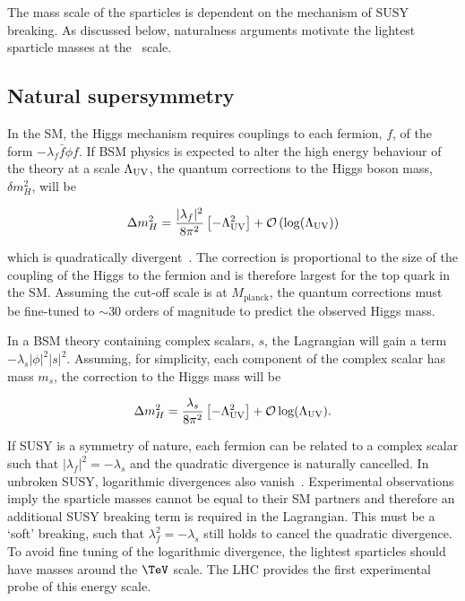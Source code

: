 The mass scale of the sparticles is dependent on the mechanism of SUSY breaking.
As discussed below, naturalness arguments motivate the lightest sparticle masses 
at the \TeV~scale.

\subsection{Natural supersymmetry}
\label{sec:natSUSY}
In the SM, the Higgs mechanism requires couplings to each fermion, $f$, of the form $-\lambda_{f}\bar{f}\phi f$. If BSM physics
is expected to alter the high energy behaviour of the theory at a scale $\Lambda_{\mathrm{UV}}$, the quantum corrections 
to the Higgs boson mass, $\delta m^2_{H}$, will be 

\begin{equation}
\Delta m^2_H =  \frac{|\lambda_f|^2}{8\pi^2}\left[-\Lambda^2_{\text{UV}}\right] + \mathcal{O}\left(\log(\Lambda_{\mathrm{UV}})\right)
\end{equation}

\noindent which is quadratically divergent~\cite{HMSSM}. The correction is proportional to the size of the coupling of the Higgs to the fermion 
and is therefore largest for the top quark in the SM. Assuming the cut-off scale is at $M_{\text{planck}}$, the quantum 
corrections must be fine-tuned to $\sim 30$ orders of magnitude to predict the observed Higgs mass. 

In a BSM theory containing complex scalars, $s$, the Lagrangian will gain a term $-\lambda_{s}|\phi|^2|s|^2$.
Assuming, for simplicity, each component of the complex scalar has mass $m_s$, the correction to the Higgs mass will be

\begin{equation}
\label{equ:corrHiggsSusy}
\Delta m^2_H =  \frac{\lambda_s}{8\pi^2}\left[-\Lambda^2_{\text{UV}}\right] + \mathcal{O}\log(\Lambda_{\mathrm{UV}}).
\end{equation}

If SUSY is a symmetry of nature, each fermion can be related to a complex scalar such that $|\lambda_f|^2 = -\lambda_s$ 
and the quadratic divergence is naturally cancelled. In unbroken SUSY, logarithmic divergences also vanish~\cite{HMSSM}. 
Experimental observations imply the sparticle masses cannot be equal to their SM partners and
therefore an additional SUSY breaking term is required in the Lagrangian. This must be a `soft' breaking,
such that $\lambda_f^2 = -\lambda_s$ still holds to cancel the quadratic divergence.
To avoid fine tuning of the logarithmic divergence, the lightest sparticles should have 
masses around the $\TeV$ scale. The LHC provides the first experimental probe of this energy scale.

